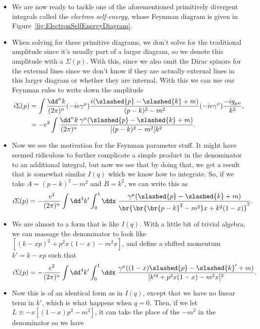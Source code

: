 \begin{itemize}
    \item We are now ready to tackle one of the aforementioned primitively divergent integrals called the \textit{electron self-energy}, whose Feynman diagram is given in Figure~\ref{fig:ElectronSelfEnergyDiagram}.
    \item When solving for these primitive diagrams, we don't solve for the traditional amplitude since it's usually part of a larger diagram, so we denote this amplitude with a $\Sigma(p)$. With this, since we also omit the Dirac spinors for the external lines since we don't know if they are actually external lines in this larger diagram or whether they are internal. With this we can use our Feynman rules to write down the amplitude
        \begin{align*}
            i\Sigma(p) &= \int \frac{\dd^n k}{(2\pi)^n} (-ie\gamma^{\mu}) \frac{i(\slashed{p} - \slashed{k} + m)}{(p-k)^2 - m^2}(-ie\gamma^{\nu}) \frac{-ig_{\mu\nu}}{k^2}, \\
            &= -e^2 \int \frac{\dd^n k}{(2\pi)^n} \frac{\gamma^{\mu}(\slashed{p} - \slashed{k} + m)}{[(p-k)^2 - m^2]k^2}.
        \end{align*}
    \item Now we see the motivation for the Feynman parameter stuff. It might have seemed ridiculous to further complicate a simple product in the denominator to an additional integral, but now we see that by doing that, we get a result that is somewhat similar $I(q)$ which we know how to integrate. So, if we take $A = (p-k)^2 - m^2$ and $B=k^2$, we can write this as
        \begin{equation*}
            i\Sigma(p) = -\frac{e^2}{(2\pi)^n} \int \dd^4k' \int_0^1 \ddx \; \frac{\gamma^{\mu}(\slashed{p} - \slashed{k} + m)}{\br{\br{\br{p-k}^2 - m^2}x + k^2(1-x)}^2}.
        \end{equation*}
    \item We are almost to a form that is like $I(q)$. With a little bit of trivial algebra, we can massage the denominator to look like $[(k-xp)^2 + p^2x(1-x) - m^2x]$, and define a shifted momentum $k' = k-xp$ such that 
        \begin{equation*}
            i\Sigma(p) = -\frac{e^2}{(2\pi)^n} \int \dd^4k' \int_0^1 \ddx \; \frac{\gamma^{\mu}((1-x)\slashed{p} - \slashed{k}' + m)}{[k^{\prime2} + p^2x(1-x) - m^2x]^2}.
        \end{equation*}
    \item Now this is of an identical form as in $I(q)$, except that we have no linear term in $k'$, which is what happens when $q=0$. Then, if we let $L \equiv -x[(1-x)p^2 - m^2]$, it can take the place of the $-m^2$ in the denominator so we have

\end{itemize}
